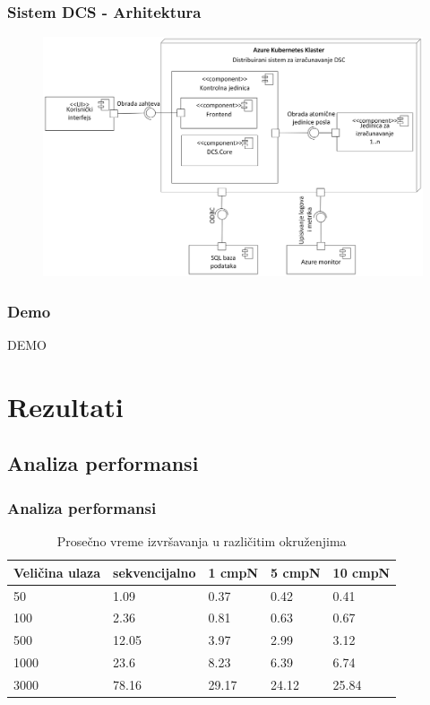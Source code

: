 \documentclass[11pt]{beamer}
\begin{document}
\begin{frame}
	\frametitle{Sistem DCS - Arhitektura}
	
	\begin{figure}
		\includegraphics[width=0.9\linewidth]{./images/arhitektura_sistema_dijagram_komponenti.png}
	\end{figure}
\end{frame}


\begin{frame}
	\frametitle{Demo}

	\begin{center}
		{\Huge DEMO}
	\end{center}

\end{frame}


\section{Rezultati}

\subsection{Analiza performansi}

\begin{frame}
	\frametitle{Analiza performansi}
	
	\begin{table}
		\begin{tabular}{ll l l l}
			\toprule
			\textbf{Veličina ulaza} & \textbf{sekvencijalno} & \textbf{1 cmpN} & \textbf{5 cmpN} & \textbf{10 cmpN}\\
			\midrule
			 50 & 1.09 & 0.37 & 0.42 & 0.41 \\ 
			 100 & 2.36 & 0.81 & 0.63 & 0.67 \\ 
			 500 & 12.05 & 3.97 & 2.99 & 3.12 \\ 
			 1000 & 23.6 & 8.23 & 6.39 & 6.74 \\ 
			 3000 & 78.16 & 29.17 & 24.12 & 25.84 \\ 
			\bottomrule
		\end{tabular}
		\caption{Prosečno vreme izvršavanja u različitim okruženjima}
	\end{table}

\end{frame}
\end{document}
